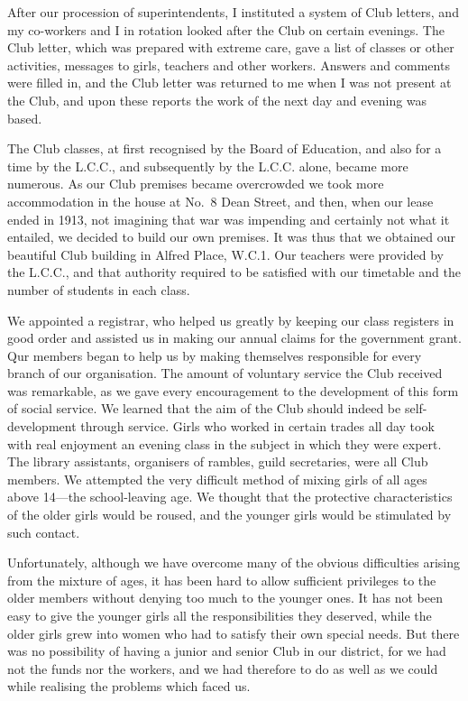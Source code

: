 After our procession of superintendents, I instituted a
system of Club letters, and my co-workers and I in rotation
looked after the Club on certain evenings. The Club
letter, which was prepared with extreme care, gave a list
of classes or other activities, messages to girls, teachers
and other workers. Answers and comments were filled
in, and the Club letter was returned to me when I was not
present at the Club, and upon these reports the work of
the next day and evening was based.

The Club classes, at first recognised by the Board of
Education, and also for a time by the L.C.C., and subsequently
by the L.C.C. alone, became more numerous.
As our Club premises became overcrowded we took more
accommodation in the house at No.\ 8 Dean Street, and
then, when our lease ended in 1913, not imagining that
war was impending and certainly not what it entailed,
we decided to build our own premises. It was thus that
we obtained our beautiful Club building in Alfred
Place, W.C.1. Our teachers were provided by the L.C.C.,
and that authority required to be satisfied with our timetable
and the number of students in each class.

We appointed a registrar, who helped us greatly by
keeping our class registers in good order and assisted us
in making our annual claims for the government grant.
Qur members began to help us by making themselves
responsible for every branch of our organisation. The
amount of voluntary service the Club received was remarkable,
as we gave every encouragement to the development
of this form of social service. We learned that the
aim of the Club should indeed be self-development
through service. Girls who worked in certain trades all
day took with real enjoyment an evening class in the
subject in which they were expert. The library assistants,
organisers of rambles, guild secretaries, were all Club
members. We attempted the very difficult method of
mixing girls of all ages above 14—the school-leaving age.
We thought that the protective characteristics of the
older girls would be roused, and the younger girls would
be stimulated by such contact.

Unfortunately, although we have overcome many of
the obvious difficulties arising from the mixture of ages,
it has been hard to allow sufficient privileges to the older
members without denying too much to the younger ones.
It has not been easy to give the younger girls all the
responsibilities they deserved, while the older girls grew
into women who had to satisfy their own special needs.
But there was no possibility of having a junior and senior
Club in our district, for we had not the funds nor the
workers, and we had therefore to do as well as we could
while realising the problems which faced us.

